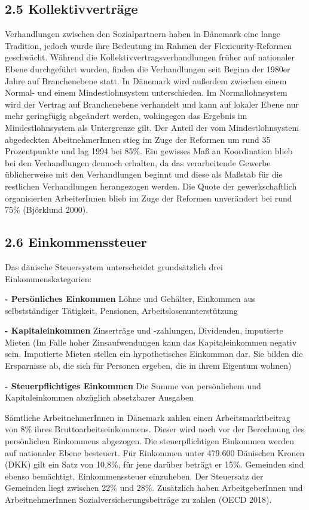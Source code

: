\documentclass[ngerman,]{article}
\begin{document}
\subsection{2.5 Kollektivverträge}\label{kollektivvertrage}

Verhandlungen zwischen den Sozialpartnern haben in Dänemark eine lange
Tradition, jedoch wurde ihre Bedeutung im Rahmen der
Flexicurity-Reformen geschwächt. Während die
Kollektivvertragsverhandlungen früher auf nationaler Ebene durchgeführt
wurden, finden die Verhandlungen seit Beginn der 1980er Jahre auf
Branchenebene statt. In Dänemark wird außerdem zwischen einem Normal-
und einem Mindestlohnsystem unterschieden. Im Normallohnsystem wird der
Vertrag auf Branchenebene verhandelt und kann auf lokaler Ebene nur mehr
geringfügig abgeändert werden, wohingegen das Ergebnis im
Mindestlohnsystem als Untergrenze gilt. Der Anteil der vom
Mindestlohnsystem abgedeckten AbeitnehmerInnen stieg im Zuge der
Reformen um rund 35 Prozentpunkte und lag 1994 bei 85\%. Ein gewisses
Maß an Koordination blieb bei den Verhandlungen dennoch erhalten, da das
verarbeitende Gewerbe üblicherweise mit den Verhandlungen beginnt und
diese als Maßstab für die restlichen Verhandlungen herangezogen werden.
Die Quote der gewerkschaftlich organisierten ArbeiterInnen blieb im Zuge
der Reformen unverändert bei rund 75\% (Björklund 2000).

\subsection{2.6 Einkommenssteuer}\label{einkommenssteuer}

Das dänische Steuersystem unterscheidet grundsätzlich drei
Einkommenskategorien:

\textbf{- Persönliches Einkommen} Löhne und Gehälter, Einkommen aus
selbstständiger Tätigkeit, Pensionen, Arbeitslosenunterstützung

\textbf{- Kapitaleinkommen} Zinserträge und -zahlungen, Dividenden,
imputierte Mieten (Im Falle hoher Zinsaufwendungen kann das
Kapitaleinkommen negativ sein. Imputierte Mieten stellen ein
hypothetisches Einkomman dar. Sie bilden die Ersparnisse ab, die sich
für Personen ergeben, die in ihrem Eigentum wohnen)

\textbf{- Steuerpflichtiges Einkommen} Die Summe von persönlichem und
Kapitaleinkommen abzüglich absetzbarer Ausgaben

Sämtliche ArbeitnehmerInnen in Dänemark zahlen einen Arbeitsmarktbeitrag
von 8\% ihres Bruttoarbeitseinkommens. Dieser wird noch vor der
Berechnung des persönlichen Einkommens abgezogen. Die steuerpflichtigen
Einkommen werden auf nationaler Ebene besteuert. Für Einkommen unter
479.600 Dänischen Kronen (DKK) gilt ein Satz von 10,8\%, für jene
darüber beträgt er 15\%. Gemeinden sind ebenso bemächtigt,
Einkommenssteuer einzuheben. Der Steuersatz der Gemeinden liegt zwischen
22\% und 28\%. Zusätzlich haben ArbeitgeberInnen und ArbeitnehmerInnen
Sozialversicherungsbeiträge zu zahlen (OECD 2018).
\end{document}

